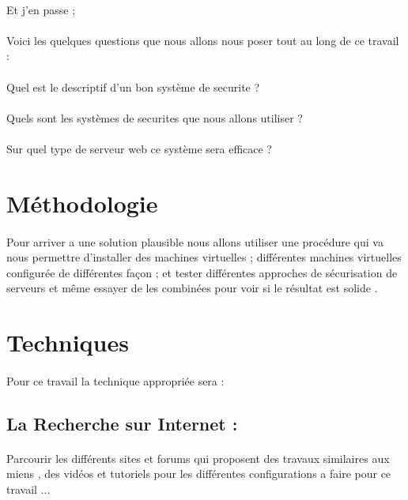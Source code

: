 \documentclass{report}
\begin{document}
   \paragraph{ }
   Et j'en passe ;
   \pagebreak
   \paragraph{ }
   Voici les  quelques questions que nous allons nous poser tout au long de ce travail :
   \paragraph{ }
   \textendash \space Quel est le descriptif d'un bon système de securite ?
   \paragraph{ }
   \textendash \space Quels sont les systèmes de securites  que nous allons utiliser ?
   \paragraph{ }
   \textendash \space Sur quel type de serveur web ce système sera efficace ?
   \section{Méthodologie}
   \paragraph{ }
   Pour arriver a une solution plausible  nous allons utiliser une procédure  qui va nous permettre d'installer des machines virtuelles ; différentes machines virtuelles configurée de différentes façon  ;  et tester différentes approches de sécurisation de serveurs et même essayer de les combinées pour voir si le résultat est solide .
  \section{ Techniques }
  \paragraph{ }
  Pour ce travail la technique appropriée sera :
  \subsection{ La Recherche sur Internet :}
  \paragraph{ }
  Parcourir les différents  sites et forums qui proposent des travaux similaires aux miens , des vidéos et tutoriels pour les différentes configurations a faire  pour ce travail ...
\end{document}
